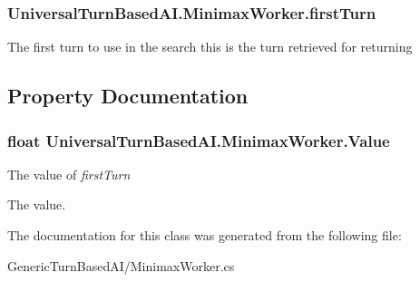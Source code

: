 \subsubsection[{first\+Turn}]{ Universal\+Turn\+Based\+A\+I.\+Minimax\+Worker.\+first\+Turn}\label{class_universal_turn_based_a_i_1_1_minimax_worker_a7b1186503a4def5fa695b58502d05c9b}


The first turn to use in the search this is the turn retrieved for returning 



\subsection{Property Documentation}
\hypertarget{class_universal_turn_based_a_i_1_1_minimax_worker_aba59322c19f8226090dfaf8d7b5d8737}{}
\subsubsection[{Value}]{\setlength{\rightskip}{0pt plus 5cm}float Universal\+Turn\+Based\+A\+I.\+Minimax\+Worker.\+Value\hspace{0.3cm}{\ttfamily [get]}}\label{class_universal_turn_based_a_i_1_1_minimax_worker_aba59322c19f8226090dfaf8d7b5d8737}


The value of {\itshape first\+Turn}  

The value.

The documentation for this class was generated from the following file\+:\begin{DoxyCompactItemize}
\item 
Generic\+Turn\+Based\+A\+I/Minimax\+Worker.\+cs\end{DoxyCompactItemize}
